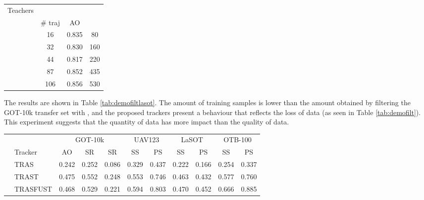 \documentclass[runningheads]{llncs}
\makeatletter
\def\myalgonamefirst{TRAS\@\xspace}
\def\myalgonamesecond{TRAST\@\xspace}
\def\myalgonamethird{TRASFUST\@\xspace}
\makeatother
\begin{document}
\begin{table*}[t]
\fontsize{5}{6}\selectfont
\centering
	\caption{Teacher-based statistics of the LaSOT transfer set.}
	\label{tab:demostatslasot}
\setlength\tabcolsep{.05cm}
\begin{tabular}{l | c c c }
		\toprule
Teachers & \multicolumn{3}{c}{} \\
& \# traj & AO &  \\
		\midrule
		 & 16 & 0.835 & 80 \\
		 & 32 & 0.830 & 160 \\
		 & 44 & 0.817 & 220 \\
		 & 87 & 0.852 & 435 \\
		 & 106 & 0.856	& 530 \\
		\bottomrule		
\end{tabular}
\end{table*} 
The results are shown in Table \ref{tab:demofiltlasot}. The amount of training samples is lower than the amount obtained by filtering the GOT-10k transfer set with , and the proposed trackers present a behaviour that reflects the loss of data (as seen in Table \ref{tab:demofilt}). This experiment suggests that the quantity of data has more impact than the quality of data.
\begin{table*}[t]
\fontsize{5}{6}\selectfont
\centering
	\caption{Performance of the proposed trackers considering the training set of LaSOT as transfer set.}
	\label{tab:demofiltlasot}
\setlength\tabcolsep{.08cm}
\begin{tabular}{l | l | c c c | c c | c c | c c }
		\toprule
		& & \multicolumn{3}{c|}{GOT-10k} & \multicolumn{2}{c|}{UAV123} & \multicolumn{2}{c|}{LaSOT} &  \multicolumn{2}{c}{OTB-100}  \\
		
		& \multirow{-2}{*}{Tracker} 	& AO & SR & SR & SS & PS  & SS  & PS & SS & PS \\
		\midrule
		
		 & \myalgonamefirst	& 0.242 & 0.252 & 0.086 & 0.329 & 0.437 & 0.222 & 0.166 & 0.254 & 0.337 \\
		 & \myalgonamesecond	& 0.475 & 0.552 & 0.248	&  0.553 & 0.746 & 0.463 & 0.432 & 0.577 & 0.760 \\
		 \multirow{-3}{*}{} & \myalgonamethird	& 0.468	& 0.529 & 0.221 & 0.594 & 0.803 & 0.470 & 0.452 & 0.666 & 0.885 \\
		
		\bottomrule		
\end{tabular}
\end{table*} 
\end{document}
